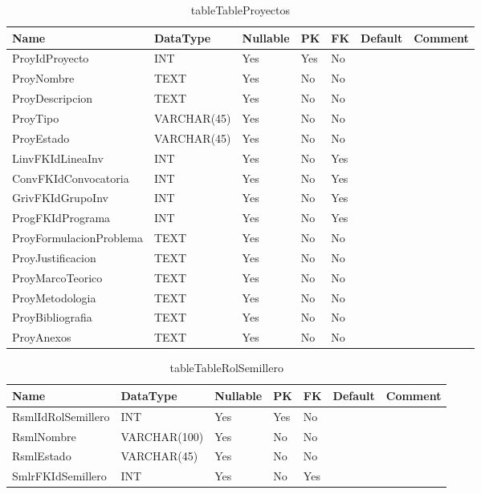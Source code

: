 \begin{table}
	\caption{tableTableProyectos}
	\label{labelTableProyectos}
	\begin{tabular}{ |l|l|l|l|l|l|l| }
		\hline
		Name & DataType & Nullable & PK & FK & Default & Comment \\ \hline
		ProyIdProyecto & INT & Yes & Yes & No &  & \\ \hline 
		ProyNombre & TEXT & Yes & No & No &  & \\ \hline 
		ProyDescripcion & TEXT & Yes & No & No &  & \\ \hline 
		ProyTipo & VARCHAR(45) & Yes & No & No &  & \\ \hline 
		ProyEstado & VARCHAR(45) & Yes & No & No &  & \\ \hline 
		LinvFKIdLineaInv & INT & Yes & No & Yes &  & \\ \hline 
		ConvFKIdConvocatoria & INT & Yes & No & Yes &  & \\ \hline 
		GrivFKIdGrupoInv & INT & Yes & No & Yes &  & \\ \hline 
		ProgFKIdPrograma & INT & Yes & No & Yes &  & \\ \hline 
		ProyFormulacionProblema & TEXT & Yes & No & No &  & \\ \hline 
		ProyJustificacion & TEXT & Yes & No & No &  & \\ \hline 
		ProyMarcoTeorico & TEXT & Yes & No & No &  & \\ \hline 
		ProyMetodologia & TEXT & Yes & No & No &  & \\ \hline 
		ProyBibliografia & TEXT & Yes & No & No &  & \\ \hline 
		ProyAnexos & TEXT & Yes & No & No &  & \\ \hline 
		
	\end{tabular}
\end{table}


\begin{table}
	\caption{tableTableRolSemillero}
	\label{labelTableRolSemillero}
	\begin{tabular}{ |l|l|l|l|l|l|l| }
		\hline
		Name & DataType & Nullable & PK & FK & Default & Comment \\ \hline
		RsmlIdRolSemillero & INT & Yes & Yes & No &  & \\ \hline 
		RsmlNombre & VARCHAR(100) & Yes & No & No &  & \\ \hline 
		RsmlEstado & VARCHAR(45) & Yes & No & No &  & \\ \hline 
		SmlrFKIdSemillero & INT & Yes & No & Yes &  & \\ \hline 
		
	\end{tabular}
\end{table}


